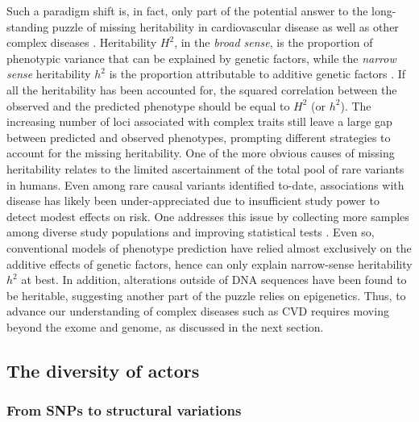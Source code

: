 \documentclass[letter]{bioinfo}
\begin{document}
Such a paradigm shift is, in fact, only part of the potential answer to the long-standing puzzle of missing heritability in cardiovascular disease as well as other complex diseases \citep{Manolio:2009:Finding}. Heritability $H^2$, in the \textit{broad sense}, is the proportion of phenotypic variance that can be explained by genetic factors, while the \textit{narrow sense} heritability $h^2$ is the proportion attributable to additive genetic factors \citep{Manolio:2009:Finding}.
If all the heritability has been accounted for, the squared correlation between the observed and the predicted phenotype should be equal to $H^2$ (or $h^2$). The increasing number of loci associated with complex traits still leave a large gap between predicted and observed phenotypes, prompting different strategies to account for the missing heritability.  One of the more obvious causes of missing heritability relates to the limited ascertainment of the total pool of rare variants in humans. Even among rare causal variants identified to-date, associations with disease has likely been under-appreciated due to insufficient study power to detect modest effects on risk. One addresses this issue by collecting more samples among diverse study populations \citep{Visscher:2017:10, Lek:2016:Analysis} and improving statistical tests \citep{Zuk:2014:Searching,Kaakinen:2017:rarevariant}. Even so, conventional models of phenotype prediction have relied almost exclusively on the additive effects of genetic factors, hence can only explain narrow-sense heritability $h^2$ at best. In addition, alterations outside of DNA sequences have been found to be heritable, suggesting another part of the puzzle relies on epigenetics. Thus, to advance our understanding of complex diseases such as CVD requires moving beyond the exome and genome, as discussed in the next section.
	
	
\subsection*{The diversity of actors}

\subsubsection*{From SNPs to structural variations}
\end{document}
